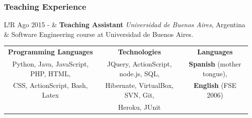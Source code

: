 \documentclass[10pt]{article}
\newcommand\VRule{\color{lightgray}\vrule width 0.5pt}
\begin{document}
\subsubsection*{Teaching Experience}

\begin{tabular}{L!{\VRule}R}
	Ago 2015 - & \textbf{Teaching Assistant} \textit{Universidad de 
		Buenos 
		Aires}, Argentina\\
	& Software Engineering course at Universidad de Buenos Aires.\\
\end{tabular}


%
%
%
%
%


\vspace{1em}
\begin{tabular}{ccc}
\textbf{Programming Languages} & \textbf{Technologies} & \textbf{Languages}\\
Python, Java, JavaScript, PHP, HTML,
 & JQuery, ActionScript, node.js, SQL, 
 & {\bf Spanish} (mother tongue), \\
 CSS, ActionScript, Bash, Latex &  Hibernate, VirtualBox, SVN, Git, & {\bf 
 English} (FSE 2006)\\
 &  Heroku, JUnit & \\
\end{tabular}
\end{document}
